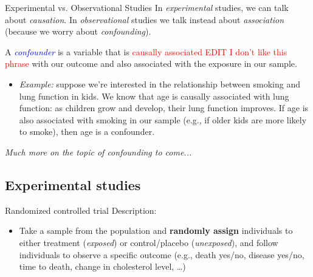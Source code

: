 \documentclass[10pt,t]{beamer}
\begin{document}
	
\begin{frame}{Experimental vs. Observational Studies}
In \textit{experimental} studies, we can talk about \color{blue} \textit{causation}\color{black}. In \textit{observational} studies we  talk instead about \color{blue} \textit{association} \color{black}(because we worry about \color{blue} \textit{confounding}\color{black}). \\

\vspace{0.3cm}

A \textit{\textcolor{blue}{confounder}} is a variable that is \textcolor{red}{causally associated EDIT I don't like this phrase} with our outcome and also associated with the exposure in our sample.  \\

\vspace{0.3cm}

\begin{itemize}
	\item[] \textit{Example:} suppose we're interested in the relationship between smoking and lung function in kids. We know that age is causally associated with lung function: as children grow and develop, their lung function improves. If age is also associated with smoking in our sample (e.g., if older kids are more likely to smoke), then age is a confounder.
\end{itemize} 

\vspace{0.3cm}

\small \textit{Much more on the topic of confounding to come...} 
\end{frame}

\subsection{Experimental studies}

\begin{frame}{Randomized controlled trial}
Description:
\begin{itemize}
	\item Take a sample from the population and \textbf{randomly assign} individuals to either treatment (\textit{exposed}) or control/placebo (\textit{unexposed}), and follow individuals to observe a specific outcome (e.g., death yes/no, disease yes/no, time to death, change in cholesterol level, \dots)
\end{itemize}
\end{frame}
\end{document}
